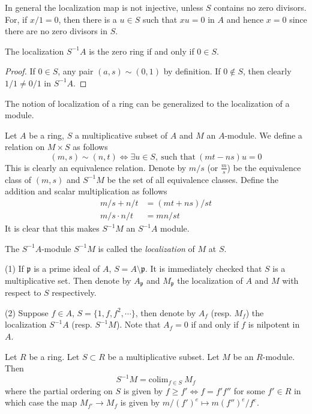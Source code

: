 \noindent
In general the localization map is not injective, unless $S$
contains no zero divisors. For, if $x/1=0$, then there is a $u\in S$
such that $xu=0$ in $A$ and hence $x=0$ since there are no zero
divisors in $S$.

\begin{lemma}
\label{lemma-localization-zero}
The localization $S^{-1}A$ is the zero ring if and only if $0\in S$.
\end{lemma}

\begin{proof}
If $0\in S$, any pair $(a,s)\sim (0,1)$ by definition.
If $0\not \in S$, then clearly $1/1 \neq 0/1$ in $S^{-1}A$.
\end{proof}

\noindent
The notion of localization of a ring can be generalized to the
localization of a module.

\medskip\noindent
Let $A$ be a ring, $S$ a multiplicative subset of $A$ and $M$ an $A$-module.
We define a relation on
$M\times S$ as follows
\[
(m,s)\sim(n,t) \iff \exists u\in S,\ \text{such that}\ (mt-ns)u=0
\]
This is clearly an equivalence relation. Denote by $m/s$ (or
$\frac{m}{s}$) be the equivalence class of $(m,s)$ and $S^{-1}M$ be
the set of all equivalence classes. Define the addition and scalar
multiplication as follows
\begin{align}
m/s+n/t&=(mt+ns)/st\\
m/s\cdot n/t&=mn/st
\end{align}
It is clear that this makes $S^{-1}M$ an $S^{-1}A$ module.

\medskip\noindent
The $S^{-1}A$-module $S^{-1}M$ is called the \emph{localization} of $M$ at $S$.

\begin{example}
(1) If $\mathfrak p$ is a prime ideal of $A$, $S=A\setminus\mathfrak p$. It is
immediately checked that $S$ is a multiplicative set. Then denote by
$A_\mathfrak p$ and $M_\mathfrak p$ the localization of $A$ and $M$ with 
respect to
$S$ respectively.

(2) Suppose $f\in A$, $S=\{1,f,f^2,\cdots\}$, then denote by $A_f$
(resp. $M_f$) the localization $S^{-1}A$ (resp. $S^{-1}M$). Note
that $A_f=0$ if and only if $f$ is nilpotent in $A$.
\end{example}

\begin{lemma}
\label{lemma-localization-colimit}
Let $R$ be a ring.
Let $S \subset R$ be a multiplicative subset.
Let $M$ be an $R$-module.
Then
$$
S^{-1}M = \text{colim}_{f \in S}\ M_f
$$
where the partial ordering on $S$ is given by
$f \geq f' \Leftrightarrow f = f'f''$ for some $f' \in R$
in which case the map $M_{f'} \to M_f$ is given
by $m/(f')^e \mapsto m(f'')^e/f^e$.
\end{lemma}

